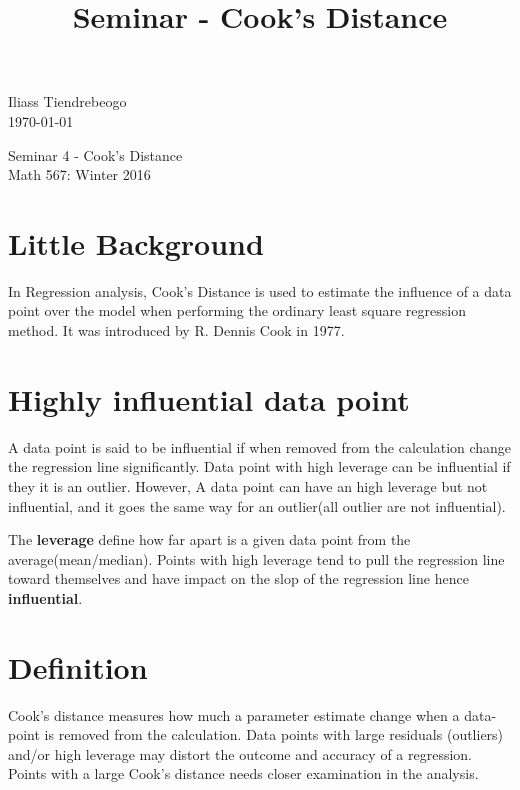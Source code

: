 \documentclass{article}[16pt]
\begin{document}
\begin{center}


\title{Seminar - Cook's Distance }
\hfill Iliass Tiendrebeogo\\

\hfill \today\\
\end{center}
\bigskip

\begin{center}
  \begin{Large}
      
    Seminar 4 - Cook's Distance \\
    Math 567: Winter 2016 \\
       
  \end{Large}
\end{center}

\bigskip
\section{Little Background}
In Regression analysis, Cook's Distance is used to estimate the influence of a data point over the model when performing the ordinary least square regression method. It was introduced by R. Dennis Cook in 1977. \citep{cook} 
\section{Highly influential  data point}
A data point is said to be influential if when removed from the calculation change the regression line significantly. Data point with high leverage can be influential if they it is an outlier. However, A data point can have an high leverage but not influential, and it goes the same way for an outlier(all outlier are not influential).

The {\bf leverage} define how far apart is a given data point from the average(mean/median). Points with high leverage tend to pull the regression line toward themselves and have impact on the slop of the regression line hence {\bf influential}.
\section{Definition}
Cook's distance measures how much a parameter estimate change when a data-point is removed from the calculation. Data points with large residuals (outliers) and/or high leverage may distort the outcome and accuracy of a regression. Points with a large Cook's distance needs closer examination in the analysis.
\end{document}
